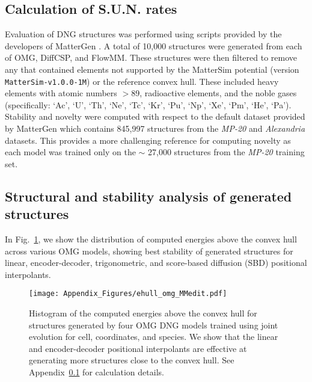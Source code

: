 \subsection{Calculation of S.U.N. rates}
\label{sun_calc}
Evaluation of DNG structures was performed using scripts provided by the developers of MatterGen \citep{mattergen_microsoft_2025}. A total of 10,000 structures were generated from each of OMG, DiffCSP, and FlowMM. These structures were then filtered to remove any that contained elements not supported by the MatterSim potential (version \texttt{MatterSim-v1.0.0-1M}) or the reference convex hull. These included heavy elements with atomic numbers $>$89, radioactive elements, and the noble gases (specifically: `Ac', `U', `Th', `Ne', `Tc', `Kr', `Pu', `Np', `Xe', `Pm', `He', `Pa'). Stability and novelty were computed with respect to the default dataset provided by MatterGen which contains 845,997 structures from the \textit{MP-20} \citep{jain_commentary_2013, xie_crystal_2022} and \textit{Alexandria} \citep{schmidt_dataset_2022, schmidt_largescale_2022} datasets. This provides a more challenging reference for computing novelty as each model was trained only on the $\sim$ 27,000 structures from the \textit{MP-20} training set.

\subsection{Structural and stability analysis of generated structures}

In Fig.~\ref{fig:ehull_omg}, we show the distribution of computed energies above the convex hull across various OMG models, showing best stability of generated structures for linear, encoder-decoder, trigonometric, and score-based diffusion (SBD) positional interpolants.


\begin{figure}[th]
   \centering
   \texttt{[image: Appendix\_Figures/ehull\_omg\_MMedit.pdf]}
   \caption{Histogram of the computed energies above the convex hull for structures generated by four OMG DNG models trained using joint evolution for cell, coordinates, and species. We show that the linear and encoder-decoder positional interpolants are effective at generating more structures close to the convex hull. See Appendix~\ref{sun_calc} for calculation details.}
   \label{fig:ehull_omg}
\end{figure}


